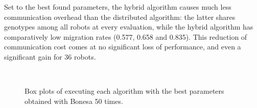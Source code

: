 \documentclass[runningheads]{llncs}
\begin{document}
Set to the best found parameters, the hybrid algorithm causes much less communication overhead than the distributed algorithm: the latter shares genotypes among all robots at every evaluation, while the hybrid algorithm has comparatively low migration rates (0.577, 0.658 and 0.835). 
This reduction of communication cost comes at no significant loss of performance, and even a significant gain for 36 robots.


\begin{figure}[b!]
  \centering
  \\
  \caption{Box plots of executing each algorithm with the best parameters obtained with Bonesa 50 times.}
  \label{fig:results}
\end{figure}
\end{document}
